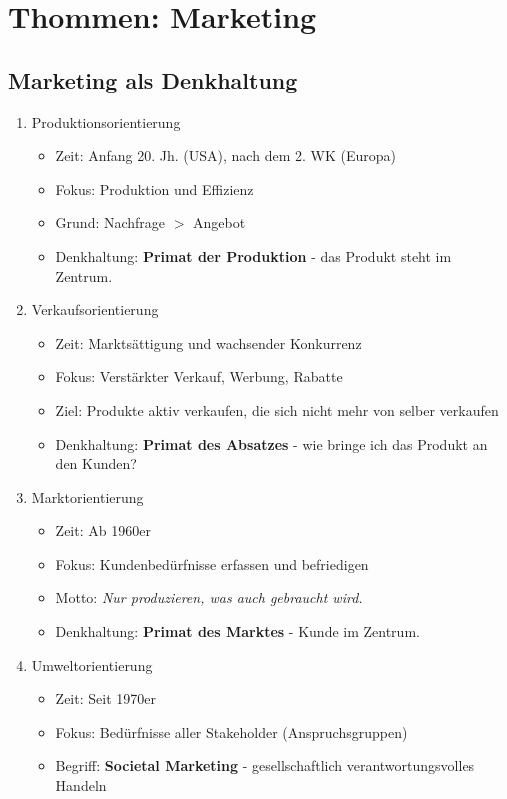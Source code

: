 \documentclass[12pt]{article}
\begin{document}
\section{Thommen: Marketing}
\subsection{Marketing als Denkhaltung}
\begin{enumerate}
    \item Produktionsorientierung
    \begin{itemize}
        \item Zeit: Anfang 20. Jh. (USA), nach dem 2. WK (Europa)
        \item Fokus: Produktion und Effizienz
        \item Grund: Nachfrage $>$ Angebot
        \item Denkhaltung: \textbf{Primat der Produktion} - das Produkt steht im Zentrum.
    \end{itemize}
    \item Verkaufsorientierung
    \begin{itemize}
        \item Zeit: Marktsättigung und wachsender Konkurrenz
        \item Fokus: Verstärkter Verkauf, Werbung, Rabatte 
        \item Ziel: Produkte aktiv verkaufen, die sich nicht mehr von selber verkaufen
        \item Denkhaltung: \textbf{Primat des Absatzes} - wie bringe ich das Produkt an den Kunden?
    \end{itemize}
    \item Marktorientierung
    \begin{itemize}
        \item Zeit: Ab 1960er
        \item Fokus: Kundenbedürfnisse erfassen und befriedigen
        \item Motto: \textit{Nur produzieren, was auch gebraucht wird.}
        \item Denkhaltung: \textbf{Primat des Marktes} - Kunde im Zentrum.
    \end{itemize}
    \item Umweltorientierung
    \begin{itemize}
        \item Zeit: Seit 1970er
        \item Fokus: Bedürfnisse aller Stakeholder (Anspruchsgruppen)
        \item Begriff: \textbf{Societal Marketing} - gesellschaftlich verantwortungsvolles Handeln

\end{itemize}
\end{enumerate}
\end{document}
